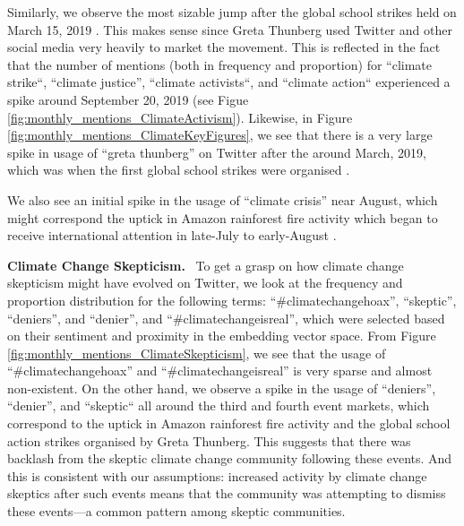\documentclass{paper}
\newcommand{\inlineSection}[1]{\vspace{0.5em}\noindent\textbf{#1.}~}
\begin{document}
Similarly, we observe the most sizable jump after the global school strikes held on March 15, 2019 \cite{wiki:greta_climate_strikes}. This makes sense since Greta Thunberg used Twitter and other social media very heavily to market the movement. This is reflected in the fact that the number of mentions (both in frequency and proportion) for ``climate strike``, ``climate justice'', ``climate activists``, and ``climate action`` experienced a spike around September 20, 2019 (see Figue \ref{fig:monthly_mentions_ClimateActivism}). Likewise, in Figure \ref{fig:monthly_mentions_ClimateKeyFigures}, we see that there is a very large spike in usage of ``greta thunberg'' on Twitter after the around March, 2019, which was when the first global school strikes were organised \cite{wiki:greta_climate_strikes}.  

We also see an initial spike in the usage of ``climate crisis'' near August, which might correspond the uptick in Amazon rainforest fire activity which began to receive international attention in late-July to early-August \cite{nasa:climate_change_consensus}. 

\inlineSection{Climate Change Skepticism} To get a grasp on how climate change skepticism might have evolved on Twitter, we look at the frequency and proportion distribution for the following terms: ``\#climatechangehoax'', ``skeptic'', ``deniers'', and ``denier'', and ``\#climatechangeisreal'', which were selected based on their sentiment and proximity in the embedding vector space. From Figure \ref{fig:monthly_mentions_ClimateSkepticism}, we see that the usage of ``\#climatechangehoax'' and ``\#climatechangeisreal'' is very sparse and almost non-existent. On the other hand, we observe a spike in the usage of ``deniers'', ``denier'', and ``skeptic`` all around the third and fourth event markets, which correspond to the uptick in Amazon rainforest fire activity and the global school action strikes organised by Greta Thunberg. This suggests that there was backlash from the skeptic climate change community following these events. And this is consistent with our assumptions: increased activity by climate change skeptics after such events means that the community was attempting to dismiss these events---a common pattern among skeptic communities.
\end{document}
